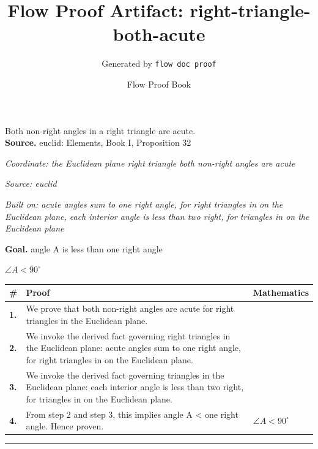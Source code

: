 \documentclass[11pt]{article}
\title{Flow Proof Artifact: right-triangle-both-acute}
\author{Generated by \texttt{flow doc proof}}
\date{Flow Proof Book}
\theoremstyle{definition}
\begin{document}
\maketitle
Both non-right angles in a right triangle are acute.\\[0.5em]
\textbf{Source.} euclid: Elements, Book I, Proposition 32\\[0.5em]
\bigskip
{}\par
\smallskip\noindent\textit{Coordinate: the Euclidean plane \cdot right triangle \cdot both non-right angles are acute}\par
\smallskip\noindent\textit{Source: euclid}\par
\smallskip\noindent\textit{Built on: acute angles sum to one right angle, for right triangles in on the Euclidean plane, each interior angle is less than two right, for triangles in on the Euclidean plane}\par
\medskip
\noindent\textbf{Goal.} angle A is less than one right angle\par
\noindent$\displaystyle \angle A < 90^\circ$\par
\medskip
\noindent
\begin{tabular}{@{} >{\raggedright\arraybackslash}p{} >{\raggedright\arraybackslash}p{} >{\raggedleft\arraybackslash}p{} @{}}
\textbf{\#} & \textbf{Proof} & \textbf{Mathematics} \\
\midrule
\textbf{1.} & We prove that both non-right angles are acute for right triangles in the Euclidean plane. & \\[0.45em]
\textbf{2.} & We invoke the derived fact governing right triangles in the Euclidean plane: acute angles sum to one right angle, for right triangles in on the Euclidean plane. & \\[0.45em]
\textbf{3.} & We invoke the derived fact governing triangles in the Euclidean plane: each interior angle is less than two right, for triangles in on the Euclidean plane. & \\[0.45em]
\textbf{4.} & From step 2 and step 3, this implies angle A < one right angle. Hence proven. & $\displaystyle \angle A < 90^\circ$ \\[0.45em]
\bottomrule
\end{tabular}
\label{thm:Geometry-right triangle-both_non_right_angles_are_acute}
\par\medskip\hrule
\end{document}
